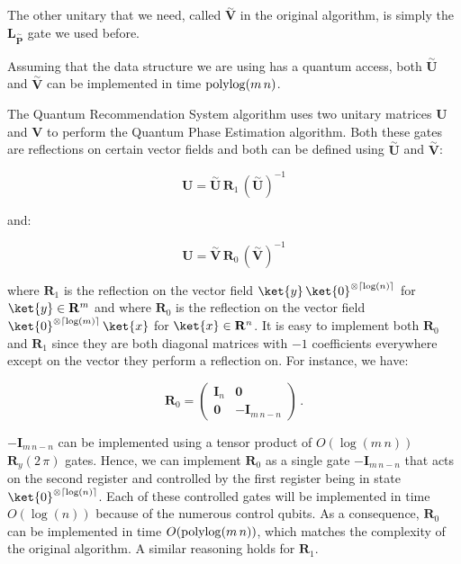\documentclass[11pt, a4paper]{article}
\begin{document}
            The other unitary that we need, called \(\overset{\sim}{\mathbf{V}}\) in the original algorithm, is simply the \(\mathbf{L}_{\overset{\sim}{\mathbf{P}}}\) gate we used before.
            
            Assuming that the data structure we are using has a quantum access, both \(\overset{\sim}{\mathbf{U}}\) and \(\overset{\sim}{\mathbf{V}}\) can be implemented in time \(\operatorname{polylog}(m\,n)\).
            
            The Quantum Recommendation System algorithm uses two unitary matrices \(\mathbf{U}\) and \(\mathbf{V}\) to perform the Quantum Phase Estimation algorithm. Both these gates are reflections on certain vector fields and both can be defined using \(\overset{\sim}{\mathbf{U}}\) and \(\overset{\sim}{\mathbf{V}}\):
            
            \[\mathbf{U}=\overset{\sim}{\mathbf{U}}\,\mathbf{R}_1\,\left(\overset{\sim}{\mathbf{U}}\right)^{-1}\]
            
            and:
            
            \[\mathbf{U}=\overset{\sim}{\mathbf{V}}\,\mathbf{R}_0\,\left(\overset{\sim}{\mathbf{V}}\right)^{-1}\]
            
            where \(\mathbf{R}_1\) is the reflection on the vector field \(\ket{y}\,\ket{0}^{\otimes\lceil\log(n)\rceil}\) for \(\ket{y}\in\mathbf{R}^m\) and where \(\mathbf{R}_0\) is the reflection on the vector field \(\ket{0}^{\otimes\lceil\log(m)\rceil}\,\ket{x}\) for \(\ket{x}\in\mathbf{R}^n\). It is easy to implement both \(\mathbf{R}_0\) and \(\mathbf{R}_1\) since they are both diagonal matrices with \(-1\) coefficients everywhere except on the vector they perform a reflection on. For instance, we have:
            
            \[\mathbf{R}_0=\begin{pmatrix}\mathbf{I}_{n} & \mathbf{0}\\\mathbf{0} & -\mathbf{I}_{m\,n - n}\end{pmatrix}\,.\]
            
            \(-\mathbf{I}_{m\,n-n}\) can be implemented using a tensor product of \(O(\log(m\,n))\) \(\mathbf{R}_y(2\,\pi)\) gates. Hence, we can implement \(\mathbf{R}_0\) as a single gate \(-\mathbf{I}_{m\,n-n}\) that acts on the second register and controlled by the first register being in state \(\ket{0}^{\otimes\lceil\log(n)\rceil}\). Each of these controlled gates will be implemented in time \(O(\log(n))\) because of the numerous control qubits. As a consequence, \(\mathbf{R}_0\) can be implemented in time \(O(\operatorname{polylog}(m\,n))\), which matches the complexity of the original algorithm. A similar reasoning holds for \(\mathbf{R}_1\).
            
\end{document}

